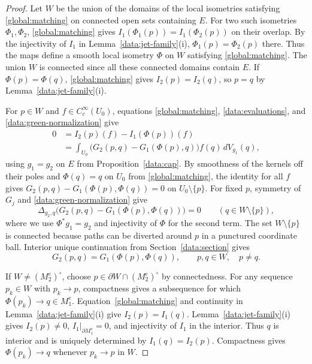 \documentclass[11pt,a4paper]{article}
\theoremstyle{definition}
\theoremstyle{remark}
\numberwithin{equation}{section}
\begin{document}
\begin{proof}
Let $W$ be the union of the domains of the local isometries satisfying
\eqref{global:matching} on connected open sets containing $E$.
For two such isometries $\Phi_1,\Phi_2$, \eqref{global:matching} gives
$I_1(\Phi_1(p))=I_1(\Phi_2(p))$ on their overlap. By the injectivity
of $I_1$ in Lemma~\ref{data:jet-family}(i), $\Phi_1(p)=\Phi_2(p)$
there. Thus the maps define a smooth local isometry $\Phi$ on $W$
satisfying \eqref{global:matching}. The union $W$ is connected since
all these connected domains contain $E$. If $\Phi(p)=\Phi(q)$,
\eqref{global:matching} gives $I_2(p)=I_2(q)$, so $p=q$ by
Lemma~\ref{data:jet-family}(i).

For $p\in W$ and $f\in C_c^\infty(U_0)$, equations
\eqref{global:matching}, \eqref{data:evaluations}, and
\eqref{data:green-normalization} give
\begin{align*}
 0&=I_2(p)(f)-I_1(\Phi(p))(f)\\
  &=\int_{U_0}\bigl(G_2(p,q)-G_1(\Phi(p),q)\bigr)f(q)\,dV_{g_1}(q),
\end{align*}
using $g_1=g_2$ on $E$ from Proposition~\ref{data:cap}.
By smoothness of the kernels off their poles and
$\Phi(q)=q$ on $U_0$ from \eqref{global:matching}, the identity for all
$f$ gives $G_2(p,q)-G_1(\Phi(p),\Phi(q))=0$ on $U_0\setminus\{p\}$.
For fixed $p$, symmetry of $G_j$ and \eqref{data:green-normalization} give
\[
 \Delta_{g_2,q}\bigl(G_2(p,q)-G_1(\Phi(p),\Phi(q))\bigr)=0
 \qquad(q\in W\setminus\{p\}),
\]
where we use $\Phi^*g_1=g_2$ and injectivity of $\Phi$ for the
second term. The set $W\setminus\{p\}$ is connected because paths
can be diverted around $p$ in a punctured coordinate ball.
Interior unique continuation from Section~\ref{data:section} gives
\begin{equation}\label{global:green-equality}
 G_2(p,q)=G_1(\Phi(p),\Phi(q)),
             \qquad p,q\in W,\quad p\ne q.
\end{equation}

If $W\ne(M_2^e)^\circ$, choose $p\in\partial W\cap(M_2^e)^\circ$
by connectedness. For any sequence $p_k\in W$ with $p_k\to p$,
compactness gives a subsequence for which $\Phi(p_k)\to q\in M_1^e$.
Equation~\eqref{global:matching} and continuity in
Lemma~\ref{data:jet-family}(i) give $I_2(p)=I_1(q)$.
Lemma~\ref{data:jet-family}(i) gives $I_2(p)\ne0$,
$I_1|_{\partial M_1^e}=0$, and injectivity of $I_1$ in the interior.
Thus $q$ is interior and is uniquely determined by $I_1(q)=I_2(p)$.
Compactness gives $\Phi(p_k)\to q$ whenever $p_k\to p$ in $W$.


\end{proof}
\end{document}
